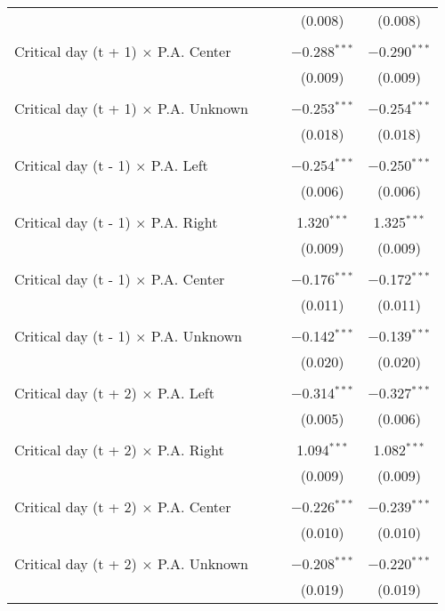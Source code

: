 \documentclass[
]{article}
\begin{document}
\begin{table}[!htbp]
{\begin{tabular}{@{\extracolsep{5pt}}lcccc}
  &  &  & (0.008) & (0.008) \\ 
  & & & & \\ 
 Critical day (t + 1) $\times$ P.A. Center &  &  & $-$0.288$^{***}$ & $-$0.290$^{***}$ \\ 
  &  &  & (0.009) & (0.009) \\ 
  & & & & \\ 
 Critical day (t + 1) $\times$ P.A. Unknown &  &  & $-$0.253$^{***}$ & $-$0.254$^{***}$ \\ 
  &  &  & (0.018) & (0.018) \\ 
  & & & & \\ 
 Critical day (t - 1) $\times$ P.A. Left &  &  & $-$0.254$^{***}$ & $-$0.250$^{***}$ \\ 
  &  &  & (0.006) & (0.006) \\ 
  & & & & \\ 
 Critical day (t - 1) $\times$ P.A. Right &  &  & 1.320$^{***}$ & 1.325$^{***}$ \\ 
  &  &  & (0.009) & (0.009) \\ 
  & & & & \\ 
 Critical day (t - 1) $\times$ P.A. Center &  &  & $-$0.176$^{***}$ & $-$0.172$^{***}$ \\ 
  &  &  & (0.011) & (0.011) \\ 
  & & & & \\ 
 Critical day (t - 1) $\times$ P.A. Unknown &  &  & $-$0.142$^{***}$ & $-$0.139$^{***}$ \\ 
  &  &  & (0.020) & (0.020) \\ 
  & & & & \\ 
 Critical day (t + 2) $\times$ P.A. Left &  &  & $-$0.314$^{***}$ & $-$0.327$^{***}$ \\ 
  &  &  & (0.005) & (0.006) \\ 
  & & & & \\ 
 Critical day (t + 2) $\times$ P.A. Right &  &  & 1.094$^{***}$ & 1.082$^{***}$ \\ 
  &  &  & (0.009) & (0.009) \\ 
  & & & & \\ 
 Critical day (t + 2) $\times$ P.A. Center &  &  & $-$0.226$^{***}$ & $-$0.239$^{***}$ \\ 
  &  &  & (0.010) & (0.010) \\ 
  & & & & \\ 
 Critical day (t + 2) $\times$ P.A. Unknown &  &  & $-$0.208$^{***}$ & $-$0.220$^{***}$ \\ 
  &  &  & (0.019) & (0.019) \\ 

\end{tabular}}
\end{table}
\end{document}
